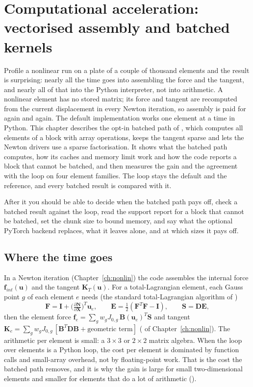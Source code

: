\chapter{Computational acceleration: vectorised assembly and batched kernels}\label{ch:batch}

\begin{tcolorbox}[colback=hpale,colframe=hnavy!60,coltitle=white,colbacktitle=hnavy!85,title={In this chapter}]
Profile a nonlinear run on a plate of a couple of thousand elements and the result is surprising: nearly all the time goes into assembling the force and the tangent, and nearly all of that into the Python interpreter, not into arithmetic. A nonlinear element has no stored matrix; its force and tangent are recomputed from the current displacement in every Newton iteration, so assembly is paid for again and again. The default implementation works one element at a time in Python. This chapter describes the opt-in batched path of \fea{}, which computes all elements of a block with array operations, keeps the tangent sparse and lets the Newton drivers use a sparse factorisation. It shows what the batched path computes, how its caches and memory limit work and how the code reports a block that cannot be batched, and then measures the gain and the agreement with the loop on four element families. The loop stays the default and the reference, and every batched result is compared with it.\par\smallskip
After it you should be able to decide when the batched path pays off, check a batched result against the loop, read the support report for a block that cannot be batched, set the chunk size to bound memory, and say what the optional PyTorch backend replaces, what it leaves alone, and at which sizes it pays off.
\end{tcolorbox}

\section{Where the time goes}\label{sec:bk-time}

In a Newton iteration (Chapter~\ref{ch:nonlin}) the code assembles the internal force $\bm f_{int}(\bm u)$ and the tangent $\bm K_T(\bm u)$. For a total-Lagrangian element, each Gauss point $g$ of each element $e$ needs (the standard total-Lagrangian algorithm of \citealp{belytschko2014nonlinear})
\begin{equation}\label{eq:bk-gp}
\bm F=\bm I+\Big(\tfrac{\partial\bm N}{\partial\bm X}\Big)^{T}\bm u_e,\qquad
\bm E=\tfrac12(\bm F^{T}\bm F-\bm I),\qquad
\bm S=\bm D\bm E,
\end{equation}
then the element force $\bm f_e=\sum_g w_g J_{0,g}\,\bm B(\bm u_e)^{T}\bm S$ and tangent $\bm K_e=\sum_g w_gJ_{0,g}\,[\bm B^{T}\bm D\bm B+\text{geometric term}]$ ( of Chapter~\ref{ch:nonlin}). The arithmetic per element is small: a $3\times3$ or $2\times2$ matrix algebra. When the loop over elements is a Python loop, the cost per element is dominated by function calls and small-array overhead, not by floating-point work. That is the cost the batched path removes, and it is why the gain is large for small two-dimensional elements and smaller for elements that do a lot of arithmetic ().

